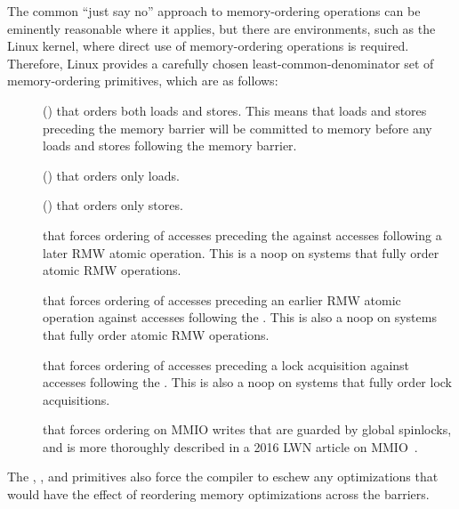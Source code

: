 The common ``just say no'' approach to memory-ordering operations
can be eminently reasonable where it applies,
but there are environments, such as the Linux kernel, where direct
use of memory-ordering operations is required.
Therefore,
Linux provides a carefully chosen least-common-denominator
set of memory-ordering primitives, which are as follows:
\begin{description}
\item	[] () that orders both loads and
	stores.
	This means that loads and stores preceding the memory barrier
	will be committed to memory before any loads and stores
	following the memory barrier.
\item	[] () that orders only loads.
\item	[] () that orders only stores.
\item	[] that forces ordering of accesses
	preceding the  against accesses following
	a later RMW atomic operation.
	This is a noop on systems that fully order atomic RMW operations.
\item	[] that forces ordering of accesses
	preceding an earlier RMW atomic operation against accesses
	following the .
	This is also a noop on systems that fully order atomic RMW operations.
\item	[] that forces ordering of accesses
	preceding a lock acquisition against accesses
	following the .
	This is also a noop on systems that fully order lock acquisitions.
\item	[] that forces ordering on MMIO writes that are guarded
	by global spinlocks, and is more thoroughly described
	in a 2016 LWN article on MMIO~\cite{PaulEMcKenney2016LinuxKernelMMIO}.
\end{description}
The , , and 
primitives also force
the compiler to eschew any optimizations that would have the effect
of reordering memory optimizations across the barriers.

\QuickQuizEnd

